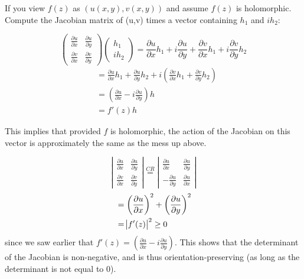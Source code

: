 \begin{remark}
If you view $f(z)$ as $(u(x,y), v(x,y))$ and assume $f(z)$ is holomorphic. Compute the Jacobian matrix of (u,v) times a vector containing $h_1$ and $ih_2$:

\[ \left( \begin{array}{cc}
\frac{\partial u}{\partial x} & \frac{\partial u}{\partial y} \\
\frac{\partial v}{\partial x} & \frac{\partial v}{\partial y}
\end{array} \right)
%
\left( \begin{array}{cc}
h_1 \\
ih_2
\end{array} \right) =
\frac{\partial u}{\partial x}h_1 +i\frac{\partial u}{\partial y} + \frac{\partial v}{\partial x}h_1 +i\frac{\partial v}{\partial y}h_2
\]
\begin{align*}
&=\frac{\partial u}{\partial x}h_1 + \frac{\partial u}{\partial y}h_2 + i\left(\frac{\partial v}{\partial x}h_1 + \frac{\partial v}{\partial y}h_2\right)\\
&=\left(\frac{\partial u}{\partial x} -i\frac{\partial u}{\partial y}  \right)h\\
&= f'(z)h
\end{align*}

This implies that provided $f$ is holomorphic, the action of the Jacobian on this vector is approximately the same as the mess up above.
\end{remark}

\begin{remark}
\[ \left| \begin{array}{cc}
\frac{\partial u}{\partial x} & \frac{\partial u}{\partial y} \\
\frac{\partial v}{\partial x} & \frac{\partial v}{\partial y}
\end{array} \right| \overset{CR}{=} \left| \begin{array}{cc}
\frac{\partial u}{\partial x} & \frac{\partial u}{\partial y} \\
-\frac{\partial u}{\partial y} & \frac{\partial u}{\partial x}
\end{array} \right|
\]
\begin{align*}
    &= \left(\frac{\partial u}{\partial x}\right)^2 + \left(\frac{\partial u}{\partial y}\right)^2\\
    &= \abs{f'(z)}^2\geq 0
\end{align*}
since we saw earlier that $f'(z) = \left( \frac{\partial u}{\partial x} -i\frac{\partial u}{\partial y}\right)$. This shows that the determinant of the Jacobian is non-negative, and is thus orientation-preserving (as long as the determinant is not equal to $0$).
\end{remark}
